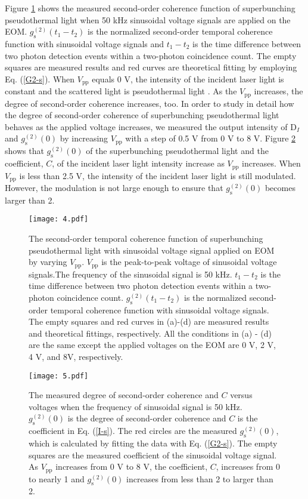 \documentclass[12pt]{iopart}
\begin{document}
Figure \ref{voltage} shows the measured second-order coherence function of superbunching pseudothermal light when 50 kHz sinusoidal voltage signals are applied on the EOM. $g^{(2)}_\text{s}(t_1-t_2)$ is the normalized second-order temporal coherence function with sinusoidal voltage signals and $t_1-t_2$ is the time difference between two photon detection events within a two-photon coincidence count. The empty squares are measured results and red curves are theoretical fitting by employing Eq. (\ref{G2-s}). When $V_{\text{pp}}$ equals 0 V, the intensity of the incident laser light is constant and the scattered light is pseudothermal light \cite{martienssen}. As the $V_{\text{pp}}$ increases, the degree of second-order coherence increases, too. In order to study in detail how the degree of second-order coherence of superbunching pseudothermal light behaves as the applied voltage increases, we measured the output intensity of D$_I$ and $g^{(2)}_\text{s}(0)$ by increasing $V_{\text{pp}}$ with a step of 0.5 V from 0 V to 8 V. Figure \ref{g2-C} shows that $g^{(2)}_\text{s}(0)$ of the superbunching pseudothermal light and the coefficient, $C$, of the incident laser light intensity increase as $V_{\text{pp}}$ increases. When $V_{\text{pp}}$ is less than 2.5 V, the intensity of the incident laser light is still modulated. However, the modulation is not large enough to ensure that  $g^{(2)}_\text{s}(0)$ becomes larger than 2. 

\begin{figure}[htbp]
\centering
\texttt{[image: 4.pdf]}
\caption{The second-order temporal coherence function of superbunching pseudothermal light with sinusoidal voltage signal applied on EOM by varying $V_{\text{pp}}$. $V_{\text{pp}}$ is the peak-to-peak voltage of sinusoidal voltage signals.The frequency of the sinusoidal signal is 50 kHz. $t_1-t_2$ is the time difference between two photon detection events within a two-photon coincidence count. $g^{(2)}_\text{s}(t_1-t_2)$ is the normalized second-order temporal coherence function with sinusoidal voltage signals. The empty squares and red curves in (a)-(d) are measured results and theoretical fittings, respectively. All the conditions in (a) - (d) are the same except the applied voltages on the EOM are 0 V, 2 V, 4 V, and 8V, respectively.}\label{voltage}
\end{figure}


\begin{figure}[htbp]
\centering
\texttt{[image: 5.pdf]}
\caption{The measured degree of second-order coherence and $C$ versus voltages when the frequency of sinusoidal signal is 50 kHz. $g^{(2)}_\text{s}(0)$ is the degree of second-order coherence and $C$ is the coefficient in Eq. (\ref{I-s}). The red circles are the measured $g^{(2)}_\text{s}(0)$, which is calculated by fitting the data with Eq. (\ref{G2-s}). The empty squares are the measured coefficient of the sinusoidal voltage signal. As $V_{\text{pp}}$ increases from 0 V to 8 V, the coefficient, $C$, increases from 0 to nearly 1 and $g^{(2)}_\text{s}(0)$ increases from less than 2 to larger than 2.}\label{g2-C}
\end{figure}
\end{document}
